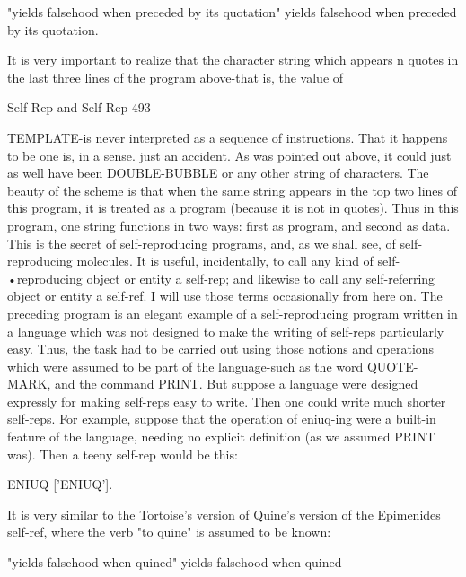 {                      "yields falsehood when preceded by its quotation"
                       yields falsehood when preceded by its quotation.

It is very important to realize that the character string which appears n quotes in the last three
lines of the program above-that is, the value of




Self-Rep and Self-Rep                                                                         493

TEMPLATE-is never interpreted as a sequence of instructions. That it happens to be one is,
in a sense. just an accident. As was pointed out above, it could just as well have been
DOUBLE-BUBBLE or any other string of characters. The beauty of the scheme is that when
the same string appears in the top two lines of this program, it is treated as a program
(because it is not in quotes). Thus in this program, one string functions in two ways: first as
program, and second as data. This is the secret of self-reproducing programs, and, as we shall
see, of self-reproducing molecules. It is useful, incidentally, to call any kind of self-
•reproducing object or entity a self-rep; and likewise to call any self-referring object or entity
a self-ref. I will use those terms occasionally from here on.
         The preceding program is an elegant example of a self-reproducing program written
in a language which was not designed to make the writing of self-reps particularly easy.
Thus, the task had to be carried out using those notions and operations which were assumed
to be part of the language-such as the word QUOTE-MARK, and the command PRINT. But
suppose a language were designed expressly for making self-reps easy to write. Then one
could write much shorter self-reps. For example, suppose that the operation of eniuq-ing
were a built-in feature of the language, needing no explicit definition (as we assumed PRINT
was). Then a teeny self-rep would be this:

                                      ENIUQ ['ENIUQ'].

It is very similar to the Tortoise's version of Quine's version of the Epimenides self-ref,
where the verb "to quine" is assumed to be known:

                "yields falsehood when quined" yields falsehood when quined

}
